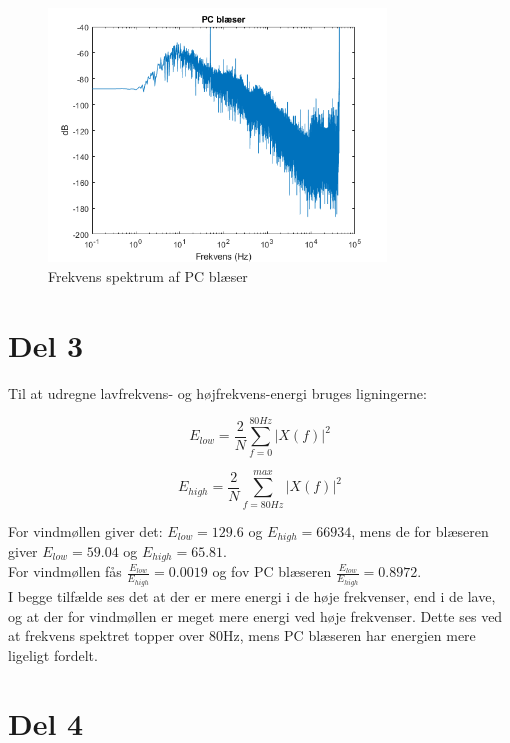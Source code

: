 \begin{figure}[h]
\centering
\includegraphics[width=0.8\textwidth]{"figures/pcFan_frekvens"}
\caption{Frekvens spektrum af PC blæser}
\label{fig:pc_freq}
\end{figure}


\section{Del 3}

Til at udregne lavfrekvens- og højfrekvens-energi bruges ligningerne:

\begin{equation}
E_{low} = \frac{2}{N} \sum_{f=0}^{80Hz} |X(f)|^2
\end{equation}

\begin{equation}
E_{high} = \frac{2}{N} \sum_{f=80Hz}^{max} |X(f)|^2
\end{equation}

For vindmøllen giver det: $E_{low} = 129.6$ og  $E_{high} = 66934$, mens de for blæseren giver  $E_{low} = 59.04$ og  $E_{high} = 65.81$.\\

For vindmøllen fås $\frac{E_{low}}{E_{high}} = 0.0019$ og fov PC blæseren $\frac{E_{low}}{E_{high}} =0.8972$.\\

I begge tilfælde ses det at der er mere energi i de høje frekvenser, end i de lave, og at der for vindmøllen er meget mere energi ved høje frekvenser. Dette ses ved at frekvens spektret topper over 80Hz, mens PC blæseren har energien mere ligeligt fordelt.


\section{Del 4}

